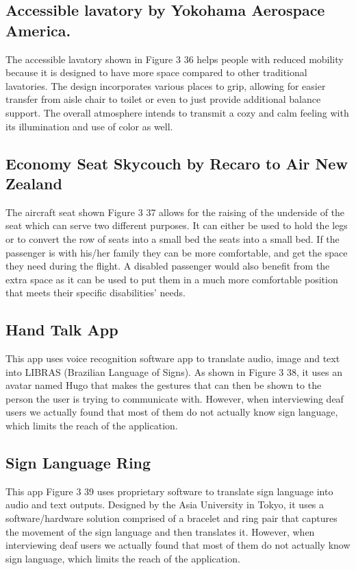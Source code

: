 \subsection{Accessible lavatory by Yokohama Aerospace America.}
The accessible lavatory shown in Figure 3 36 helps people with reduced mobility because it is designed to have more space compared to other traditional lavatories. The design incorporates various places to grip, allowing for easier transfer from aisle chair to toilet or even to just provide additional balance support. The overall atmosphere intends to transmit a cozy and calm feeling with its illumination and use of color as well.

\subsection{Economy Seat Skycouch by Recaro to Air New Zealand}
The aircraft seat shown Figure 3 37 allows for the raising of the underside of the seat which can serve two different purposes. It can either be used to hold the legs or to convert the row of seats into a small bed the seats into a small bed.   If the passenger is with his/her family they can be more comfortable, and get the space they need during the flight.  A disabled passenger would also benefit from the extra space as it can be used to put them in a much more comfortable position that meets their specific disabilities’ needs.

\subsection{Hand Talk App}
This app uses voice recognition software app to translate audio, image and text into LIBRAS (Brazilian Language of Signs).  As shown in Figure 3 38, it uses an avatar named Hugo that makes the gestures that can then be shown to the person the user is trying to communicate with.  However, when interviewing deaf users we actually found that most of them do not actually know sign language, which limits the reach of the application.

\subsection*{Sign Language Ring}
This app Figure 3 39 uses proprietary software to translate sign language into audio and text outputs. Designed by the Asia University in Tokyo, it uses a software/hardware solution comprised of a bracelet and ring pair that captures the movement of the sign language and then translates it.  However, when interviewing deaf users we actually found that most of them do not actually know sign language, which limits the reach of the application.  

